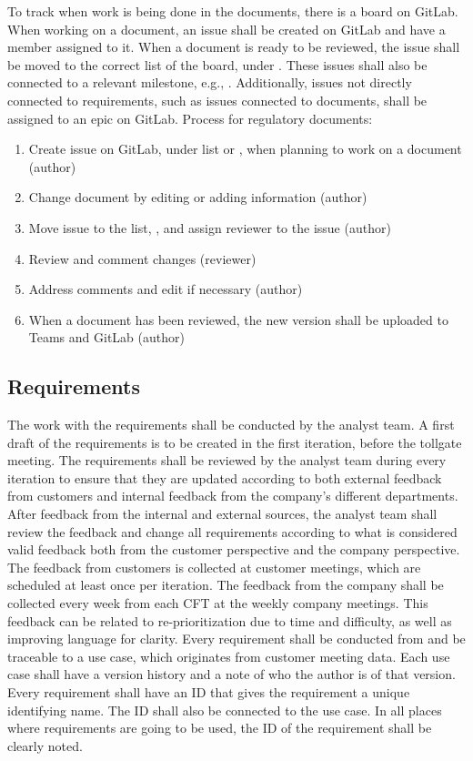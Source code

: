 To track when work is being done in the documents, there is a board on GitLab. When working on a document, an issue shall be created on GitLab and have a member assigned to it. When a document is ready to be reviewed, the issue shall be moved to the correct list of the board, under . These issues shall also be connected to a relevant milestone, e.g., . Additionally, issues not directly connected to requirements, such as issues connected to documents, shall be assigned to an epic on GitLab. Process for regulatory documents:
\begin{enumerate}
    \item Create issue on GitLab, under list  or , when planning to work on a document (author)
    \item Change document by editing or adding information (author)
    \item Move issue to the list, , and assign reviewer to the issue (author)
    \item Review and comment changes (reviewer)
    \item Address comments and edit if necessary (author)
    \item When a document has been reviewed, the new version shall be uploaded to Teams and GitLab (author)
\end{enumerate}

\subsection{Requirements}
The work with the requirements shall be conducted by the analyst team. A first draft of the requirements is to be created in the first iteration, before the tollgate meeting. The requirements shall be reviewed by the analyst team during every iteration to ensure that they are updated according to both external feedback from customers and internal feedback from the company's different departments. After feedback from the internal and external sources, the analyst team shall review the feedback and change all requirements according to what is considered valid feedback both from the customer perspective and the company perspective. The feedback from customers is collected at customer meetings, which are scheduled at least once per iteration. The feedback from the company shall be collected every week from each CFT at the weekly company meetings. This feedback can be related to re-prioritization due to time and difficulty, as well as improving language for clarity. 
Every requirement shall be conducted from and be traceable to a use case, which originates from customer meeting data. Each use case shall have a version history and a note of who the author is of that version. Every requirement shall have an ID that gives the requirement a unique identifying name. The ID shall also be connected to the use case. In all places where requirements are going to be used, the ID of the requirement shall be clearly noted. 

